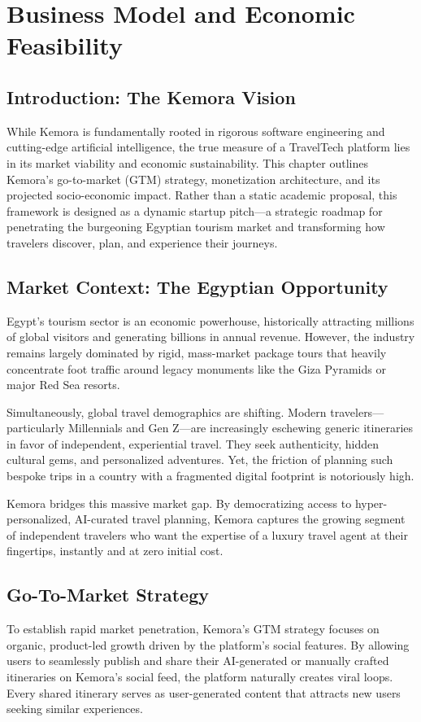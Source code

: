 \chapter{Business Model and Economic Feasibility}

\section{Introduction: The Kemora Vision}
While Kemora is fundamentally rooted in rigorous software engineering and cutting-edge artificial intelligence, the true measure of a TravelTech platform lies in its market viability and economic sustainability. This chapter outlines Kemora's go-to-market (GTM) strategy, monetization architecture, and its projected socio-economic impact. Rather than a static academic proposal, this framework is designed as a dynamic startup pitch—a strategic roadmap for penetrating the burgeoning Egyptian tourism market and transforming how travelers discover, plan, and experience their journeys.

\section{Market Context: The Egyptian Opportunity}
Egypt's tourism sector is an economic powerhouse, historically attracting millions of global visitors and generating billions in annual revenue. However, the industry remains largely dominated by rigid, mass-market package tours that heavily concentrate foot traffic around legacy monuments like the Giza Pyramids or major Red Sea resorts. 

Simultaneously, global travel demographics are shifting. Modern travelers—particularly Millennials and Gen Z—are increasingly eschewing generic itineraries in favor of independent, experiential travel. They seek authenticity, hidden cultural gems, and personalized adventures. Yet, the friction of planning such bespoke trips in a country with a fragmented digital footprint is notoriously high. 

Kemora bridges this massive market gap. By democratizing access to hyper-personalized, AI-curated travel planning, Kemora captures the growing segment of independent travelers who want the expertise of a luxury travel agent at their fingertips, instantly and at zero initial cost.

\section{Go-To-Market Strategy}
To establish rapid market penetration, Kemora's GTM strategy focuses on organic, product-led growth driven by the platform's social features. By allowing users to seamlessly publish and share their AI-generated or manually crafted itineraries on Kemora's social feed, the platform naturally creates viral loops. Every shared itinerary serves as user-generated content that attracts new users seeking similar experiences. 

